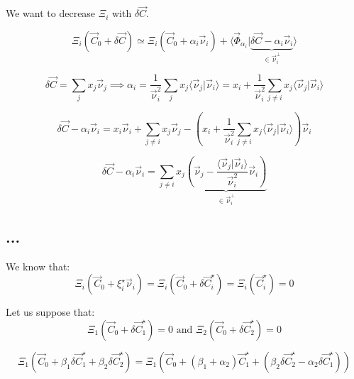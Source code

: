 \documentclass[aps,12pt]{revtex4}
\begin{document}
We want to decrease $\Xi_i$ with $\delta \vec C$.

\begin{equation}
	\Xi_i(\vec C_0 + \delta \vec C) \simeq \Xi_i(\vec C_0 + \alpha_i \vec \nu_i) + 
	\langle \vec \Phi_{\alpha_i} \vert \underbrace{\delta \vec C - \alpha_i \vec \nu_i}_{\in\vec\nu_i^\perp} \rangle
\end{equation}

\begin{equation}
	\delta \vec C = \sum_j x_j \vec \nu_j \implies 
	\alpha_i = \dfrac{1}{\vec \nu_i^2} \sum_j x_j \langle \vec \nu_j \vert \vec \nu_i \rangle
	= x_i + \dfrac{1}{\vec \nu_i^2} \sum_{j\not=i} x_j \langle \vec \nu_j \vert \vec \nu_i \rangle
\end{equation}

\begin{equation}
\delta \vec C - \alpha_i \vec\nu_i = x_i \vec\nu_i + \sum_{j\not=i} x_j \vec\nu_j - \left(  x_i + \dfrac{1}{\vec \nu_i^2} \sum_{j\not=i} x_j \langle \vec \nu_j \vert \vec \nu_i \rangle\right) \vec\nu_i
\end{equation}

\begin{equation}
\delta \vec C - \alpha_i \vec\nu_i =  \sum_{j\not=i} x_j \underbrace{\left(\vec\nu_j - \dfrac{\langle\vec \nu_j \vert \vec \nu_i \rangle}{\vec\nu_i^2} \vec\nu_i\right)}_{\in\vec\nu_i^\perp}
\end{equation}

\subsection{...}
We know that:
\begin{equation}
	\Xi_i(\vec C_0 + \xi_i^\star \vec \nu _i) = \Xi_i(\vec C_0 + \delta \vec C_i^\star) = \Xi_i(\vec C_i^\star) = 0
\end{equation}

Let us suppose that:
\begin{equation}
	\Xi_1(\vec C_0 + \delta \vec C_1^\star) = 0 \text{ and } \Xi_2(\vec C_0 + \delta \vec C_2^\star) =0 
\end{equation}

\begin{equation}
	\Xi_1(\vec C_0 + \beta_1 \delta \vec C_1^\star + \beta_2 \delta \vec C_2^\star) = 
	\Xi_1\left(\vec C_0 + (\beta_1 + \alpha_2) \vec C_1^\star + \left(\beta_2 \delta \vec C_2^\star - \alpha_2 \delta \vec C_1^\star\right) \right)
\end{equation}
\end{document}
